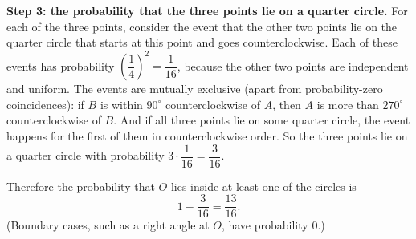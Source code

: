 \textbf{Step 3: the probability that the three points lie on a quarter circle.} For each of the three points, consider the event that the other two points lie on the quarter circle that starts at this point and goes counterclockwise. Each of these events has probability $\left(\dfrac{1}{4}\right)^2=\dfrac{1}{16}$, because the other two points are independent and uniform. The events are mutually exclusive (apart from probability-zero coincidences): if $B$ is within $90^\circ$ counterclockwise of $A$, then $A$ is more than $270^\circ$ counterclockwise of $B$. And if all three points lie on some quarter circle, the event happens for the first of them in counterclockwise order. So the three points lie on a quarter circle with probability $3\cdot\dfrac{1}{16}=\dfrac{3}{16}$.

Therefore the probability that $O$ lies inside at least one of the circles is
\[1-\dfrac{3}{16}=\boxed{\dfrac{13}{16}}.\]
(Boundary cases, such as a right angle at $O$, have probability $0$.)
